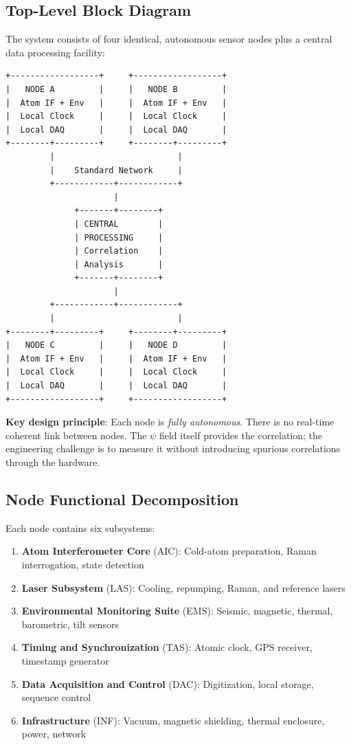 \documentclass[12pt,a4paper]{article}
\begin{document}
\subsection{Top-Level Block Diagram}

The system consists of four identical, autonomous sensor nodes plus a
central data processing facility:

\begin{tcolorbox}[colback=gray!5, colframe=gray!60, title=System Architecture]
\begin{verbatim}
+------------------+     +------------------+
|   NODE A         |     |   NODE B         |
|  Atom IF + Env   |     |  Atom IF + Env   |
|  Local Clock     |     |  Local Clock     |
|  Local DAQ       |     |  Local DAQ       |
+--------+---------+     +--------+---------+
         |                         |
         |    Standard Network     |
         +------------+------------+
                      |
              +-------+--------+
              | CENTRAL        |
              | PROCESSING     |
              | Correlation    |
              | Analysis       |
              +-------+--------+
                      |
         +------------+------------+
         |                         |
+--------+---------+     +--------+---------+
|   NODE C         |     |   NODE D         |
|  Atom IF + Env   |     |  Atom IF + Env   |
|  Local Clock     |     |  Local Clock     |
|  Local DAQ       |     |  Local DAQ       |
+------------------+     +------------------+
\end{verbatim}
\end{tcolorbox}

\textbf{Key design principle}: Each node is \emph{fully autonomous}.
There is no real-time coherent link between nodes. The $\psi$ field
itself provides the correlation; the engineering challenge is to
measure it without introducing spurious correlations through the
hardware.

\subsection{Node Functional Decomposition}

Each node contains six subsystems:

\begin{enumerate}
\item \textbf{Atom Interferometer Core} (AIC): Cold-atom preparation,
Raman interrogation, state detection
\item \textbf{Laser Subsystem} (LAS): Cooling, repumping, Raman, and
reference lasers
\item \textbf{Environmental Monitoring Suite} (EMS): Seismic, magnetic,
thermal, barometric, tilt sensors
\item \textbf{Timing and Synchronization} (TAS): Atomic clock, GPS
receiver, timestamp generator
\item \textbf{Data Acquisition and Control} (DAC): Digitization,
local storage, sequence control
\item \textbf{Infrastructure} (INF): Vacuum, magnetic shielding, thermal
enclosure, power, network
\end{enumerate}
\end{document}
